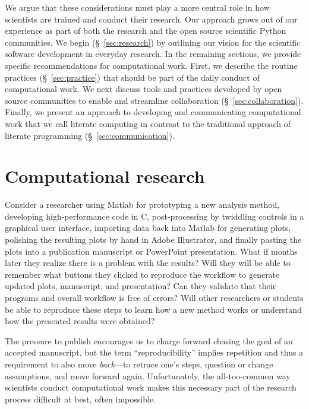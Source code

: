 \documentclass[11pt,oneside,english]{article}
\begin{document}
We argue that these considerations must play a more central role in how
scientists are trained and conduct their research. Our approach grows out of
our experience as part of both the research and the open source scientific
Python communities.  We begin (§~\ref{sec:research}) by outlining our vision
for the scientific software development in everyday research. In the remaining
sections, we provide specific recommendations for computational work.  First,
we describe the routine practices (§~\ref{sec:practice}) that should be part of
the daily conduct of computational work. We next discuss tools and practices
developed by open source communities to enable and streamline collaboration
(§~\ref{sec:collaboration}). Finally, we present an approach to developing and
communicating computational work that we call literate computing in contrast to
the traditional approach of literate programming (§~\ref{sec:communication}).

\section{\label{sec:research}Computational research}

Consider a researcher using Matlab for prototyping a new analysis method,
developing high-performance code in C, post-processing by twiddling controls in
a graphical user interface, importing data back into Matlab for
generating plots, polishing the resulting plots by hand in Adobe Illustrator,
and finally pasting the plots into a publication manuscript or PowerPoint
presentation. What if months later they realize there is a problem with the
results? Will they will be able to remember what buttons they clicked to
reproduce the workflow to generate updated plots, manuscript, and presentation?
Can they validate that their programs and overall workflow is free of errors?
Will other researchers or students be able to reproduce these steps to learn
how a new method works or understand how the presented results were obtained?

The pressure to publish encourages us to charge forward chasing the goal of an
accepted manuscript, but the term ``reproducibility'' implies repetition and
thus a requirement to also move \emph{back}---to retrace one's steps, question
or change assumptions, and move forward again. Unfortunately, the
all-too-common way scientists conduct computational work makes this necessary
part of the research process difficult at best, often impossible.
\end{document}
